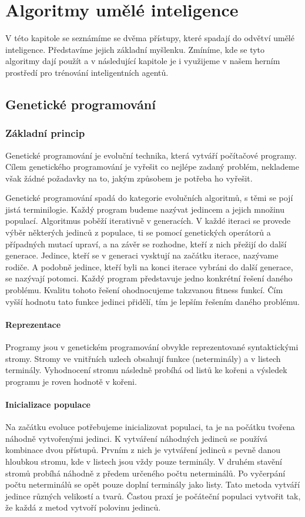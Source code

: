 \chapter{Algoritmy umělé inteligence}
V této kapitole se seznámíme se dvěma přístupy, které spadají do odvětví umělé inteligence. 
Představíme jejich základní myšlenku. Zmíníme, kde se tyto algoritmy dají použít a v následující kapitole je i využijeme v našem herním prostředí pro trénování inteligentních agentů.

\section{Genetické programování}

\subsection{Základní princip}
\cite{fieldguide}
Genetické programování je evoluční technika, která vytváří počítačové programy. Cílem genetického programování je vyřešit co nejlépe zadaný problém, neklademe však žádné požadavky na to, jakým způsobem je potřeba ho vyřešit.
\par
Genetické programování spadá do kategorie evolučních algoritmů, s těmi se pojí jistá terminilogie.
Každý program budeme nazývat jedincem a jejich množinu populací. Algoritmus poběží iterativně v generacích. 
V každé iteraci se provede výběr některých jedinců z populace, ti se pomocí genetických operátorů a případných mutací upraví, a na závěr se rozhodne, kteří z nich přežijí do další generace.
Jedince, kteří se v generaci vysktují na začátku iterace, nazývame rodiče. A podobně jedince, kteří byli na konci iterace vybráni do další generace, se nazývají potomci. 
Každý program představuje jedno konkrétní řešení daného problému. Kvalitu tohoto řešení ohodnocujeme takzvanou fitness funkcí. Čím vyšší hodnotu tato funkce jedinci přidělí, tím je lepším řešením daného problému.


\subsubsection{Reprezentace}
Programy jsou v genetickém programování obvykle reprezentované syntaktickými stromy. Stromy ve vnitřních uzlech obsahují funkce (neterminály) a v listech terminály.
Vyhodnocení stromu následně probíhá od listů ke kořeni a výsledek programu je roven hodnotě v kořeni.


\subsubsection{Inicializace populace}
Na začátku evoluce potřebujeme inicializovat populaci, ta je na počátku tvořena náhodně vytvořenými jedinci. K vytváření náhodných jedinců se používá kombinace dvou přístupů.
Prvním z nich je vytváření jedinců s pevně danou hloubkou stromu, kde v listech jsou vždy pouze terminály. V druhém stavění stromů probíhá náhodně z předem určeného počtu neterminálů.
Po vyčerpání počtu neterminálů se opět pouze doplní terminály jako listy. Tato metoda vytváří jedince různých velikostí a tvarů.
Častou praxí je počáteční populaci vytvořit tak, že každá z metod vytvoří polovinu jedinců. 


